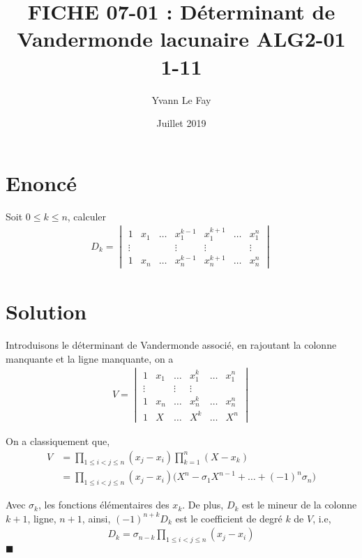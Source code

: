 \documentclass{article}
\newcommand*{\QED}{\hfill\ensuremath{\blacksquare}}%
\begin{document}
\title{FICHE 07-01 : Déterminant de Vandermonde lacunaire ALG2-01 1-11}
\author{Yvann Le Fay}
\date{Juillet 2019}
\maketitle
\section*{Enoncé}
Soit $0\leq k\leq n$, calculer
\begin{align*}
D_k = 
\begin{vmatrix}
1 & x_1 & \ldots & x_1^{k-1} & x_1^{k+1}& \ldots & x_1^n\\
\vdots & & & \vdots& \vdots & & \vdots\\
1 & x_n & \ldots & x_n^{k-1} & x_n^{k+1}& \ldots & x_n^n
\end{vmatrix}
\end{align*}

\section*{Solution}
Introduisons le déterminant de Vandermonde associé, en rajoutant la colonne manquante et la ligne manquante, on a
\begin{align*}
V = \begin{vmatrix}
1 & x_1 & \ldots & x_1^k & \ldots & x_1^n\\
\vdots & & \vdots& \vdots\\
1 & x_n & \ldots &x_n^k&  \ldots & x_n^n\\
1 & X &\ldots &X^k&\ldots &X^n
\end{vmatrix}
\end{align*} 

On a classiquement que, 
\begin{align*}
V &= \prod_{1\leq i<j\leq n}(x_j-x_i)\prod_{k=1}^n (X-x_k)\\
&=\prod_{1\leq i<j\leq n}(x_j-x_i)\bigg(X^n -\sigma_1 X^{n-1}+\ldots+(-1)^n \sigma_n\bigg)
\end{align*}

Avec $\sigma_k$, les fonctions élémentaires des $x_k$. 
De plus, $D_k$ est le mineur de la colonne $k+1$, ligne, $n+1$, ainsi, $(-1)^{n+k}D_k$ est le coefficient de degré $k$ de $V$, i.e, 
\begin{align*}
D_k = \sigma_{n-k} \prod_{1\leq i<j\leq n}(x_j-x_i)
\end{align*}
\QED
\end{document}
